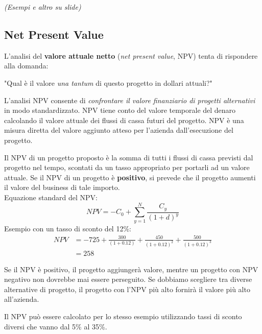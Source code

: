 \documentclass[a4paper,portrait,12pt]{article}
\theoremstyle{definition}
\begin{document}
\emph{(Esempi e altro su slide)}


\subsection{Net Present Value}

L'analisi del \textbf{valore attuale netto} (\emph{net present value}, NPV) tenta di rispondere alla domanda:
\begin{center}
"Qual è il valore \emph{una tantum} di questo progetto in dollari attuali?"
\end{center}
L'analisi NPV consente di \emph{confrontare il valore finanziario di progetti alternativi} in modo standardizzato.
NPV tiene conto del valore temporale del denaro calcolando il valore attuale dei flussi di cassa futuri del progetto.
NPV è una misura diretta del valore aggiunto atteso per l'azienda dall'esecuzione del progetto.

Il NPV di un progetto proposto è la somma di tutti i flussi di cassa previsti dal progetto nel tempo, scontati da un tasso appropriato per portarli ad un valore attuale.
Se il NPV di un progetto è \textbf{positivo}, si prevede che il progetto aumenti il valore del business di tale importo.\\

Equazione standard del NPV:
$$
NPV = -C_0 + \sum_{y=1}^N \frac{C_y}{(1+d)^y}
$$
Esempio con un tasso di sconto del 12\%:
\begin{align*}
NPV &= -725 + \frac{300}{(1+0.12)} + \frac{450}{(1+0.12)^2} + \frac{500}{(1+0.12)^3}\\
&= 258
\end{align*}


Se il NPV è positivo, il progetto aggiungerà valore, mentre un progetto con NPV negativo non dovrebbe mai essere perseguito.
Se dobbiamo scegliere tra diverse alternative di progetto, il progetto con l'NPV più alto fornirà il valore più alto all'azienda.

Il NPV può essere calcolato per lo stesso esempio utilizzando tassi di sconto diversi che vanno dal 5\% al 35\%.
\end{document}
